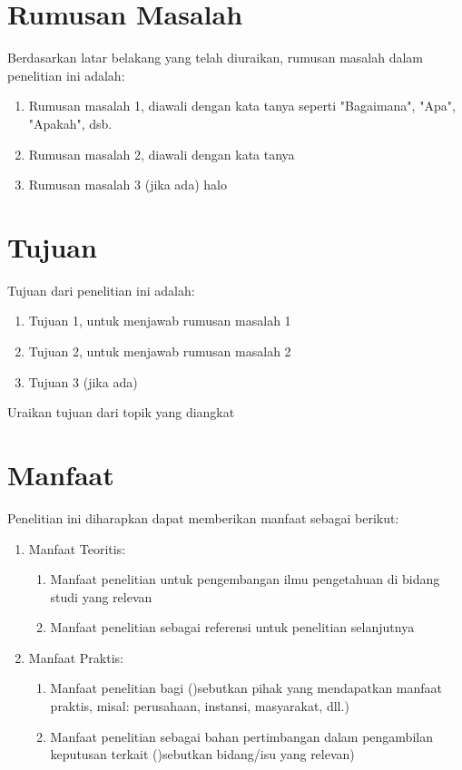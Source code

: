 \documentclass[english,12pt,a4paper]{book}
\begin{document}
\section{Rumusan Masalah}
Berdasarkan latar belakang yang telah diuraikan, rumusan masalah dalam penelitian ini adalah:
\begin{enumerate}
	\item Rumusan masalah 1, diawali dengan kata tanya seperti "Bagaimana", "Apa", "Apakah", dsb.
	\item Rumusan masalah 2, diawali dengan kata tanya
	\item Rumusan masalah 3 (jika ada) halo
\end{enumerate}
\section{Tujuan}
Tujuan dari penelitian ini adalah:
\begin{enumerate}
	\item Tujuan 1, untuk menjawab rumusan masalah 1
	\item Tujuan 2, untuk menjawab rumusan masalah 2
	\item Tujuan 3 (jika ada)
\end{enumerate}
Uraikan tujuan dari topik yang diangkat
\section{Manfaat}
Penelitian ini diharapkan dapat memberikan manfaat sebagai berikut:
\begin{enumerate}
	\item Manfaat Teoritis:
	\begin{enumerate}
		\item Manfaat penelitian untuk pengembangan ilmu pengetahuan di bidang studi yang relevan
		\item Manfaat penelitian sebagai referensi untuk penelitian selanjutnya
	\end{enumerate}
	\item Manfaat Praktis:
\begin{enumerate}
	\item Manfaat penelitian bagi ()sebutkan pihak yang mendapatkan manfaat praktis, misal: perusahaan, instansi, masyarakat, dll.)
	\item Manfaat penelitian sebagai bahan pertimbangan dalam pengambilan keputusan terkait ()sebutkan bidang/isu yang relevan)
\end{enumerate}
\end{enumerate}
\end{document}
